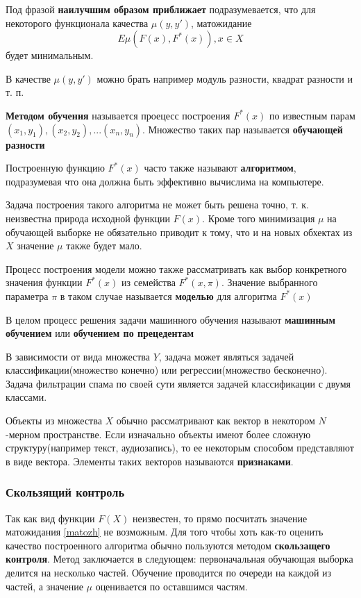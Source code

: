 Под фразой \textbf{наилучшим образом приближает} подразумевается, что для некоторого функционала качества $\mu(y, y')$, матожидание
\begin{equation}
\label{}
E\mu(F(x), F^*(x)), x \in X
\end{equation}
будет минимальным.

В качестве $\mu(y, y')$ можно брать например модуль разности, квадрат разности и т. п.

\textbf{Методом обучения} называется проецесс построения $F^*(x)$ по известным парам $(x_1, y_1), (x_2, y_2), ... (x_n, y_n)$. Множество таких пар называется \textbf{обучающей разности}

Построенную функцию $F^*(x)$ часто также называют \textbf{алгоритмом}, подразумевая что она должна быть эффективно вычислима на компьютере.

Задача построения такого алгоритма не может быть решена точно, т. к. неизвестна природа исходной функции $F(x)$. Кроме того минимизация $\mu$ на обучающей выборке не обязательно приводит к тому, что и на новых обхектах из $X$ значение $\mu$ также будет мало.

Процесс построения модели можно также рассматривать как выбор конкретного значения функции $F^*(x)$ из семейства $F^*(x, \pi)$. Значение выбранного параметра $\pi$ в таком случае называется \textbf{моделью} для алгоритма
$F^*(x)$

В целом процесс решения задачи машинного обучения называют \textbf{машинным обучением} или \textbf{обучением по прецедентам}

В зависимости от вида множества $Y$, задача может являться задачей классификации(множество конечно) или регрессии(множество бесконечно).
Задача фильтрации спама по своей сути является задачей классификации с двумя классами.

Объекты из множества $X$ обычно рассматривают как вектор в некотором $N$-мерном пространстве. Если изначально объекты имеют более сложную структуру(например текст, аудиозапись), то ее некоторым способом представляют в виде вектора. Элементы таких векторов называются \textbf{признаками}.

\subsubsection{Скользящий контроль}
Так как вид функции $F(X)$  неизвестен, то прямо посчитать значение матожидания \ref{matozh} не возможным. Для того чтобы хоть как-то оценить качество построенного алгоритма обычно пользуются методом \textbf{скользащего контроля}. Метод заключается в следующем: первоначальная обучающая выборка делится на несколько частей. Обучение проводится по очереди на каждой из частей, а значение $\mu$ оценивается по оставшимся частям.

